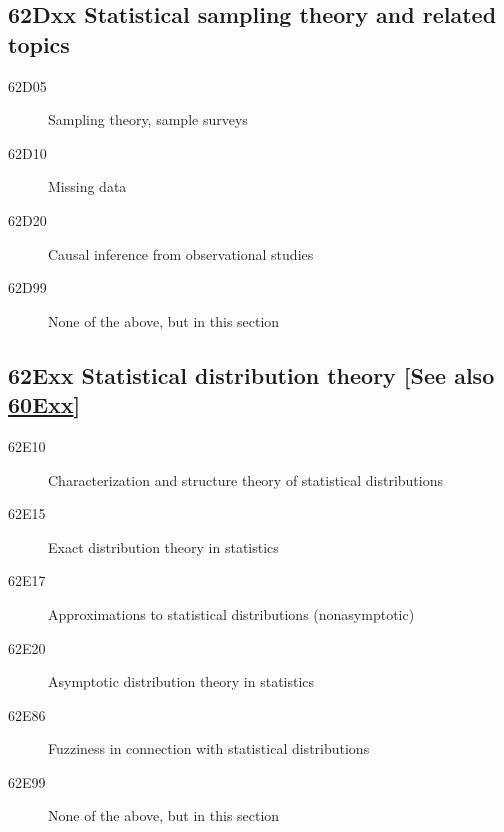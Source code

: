 \documentclass[letterpaper]{article}
\begin{document}
\subsection*{62Dxx Statistical sampling theory and related topics}\label{62Dxx}
\begin{description}  
\item [62D05]\label{62D05} Sampling theory, sample surveys
\item [62D10]\label{62D10} Missing data 
\item [62D20]\label{62D20} Causal inference from observational studies
\item [62D99]\label{62D99} None of the above, but in this section
\end{description}
\subsection*{62Exx  Statistical distribution theory [See also \hyperref[60Exx]{60Exx}] }\label{62Exx}
\begin{description}  
\item [62E10]\label{62E10} Characterization  and structure theory of statistical distributions
\item [62E15]\label{62E15} Exact distribution theory in statistics
\item [62E17]\label{62E17} Approximations to statistical distributions (nonasymptotic)
\item [62E20]\label{62E20} Asymptotic distribution theory in statistics
\item [62E86]\label{62E86} Fuzziness in connection with statistical distributions
\item [62E99]\label{62E99} None of the above, but in this section
\end{description}
\end{document}
